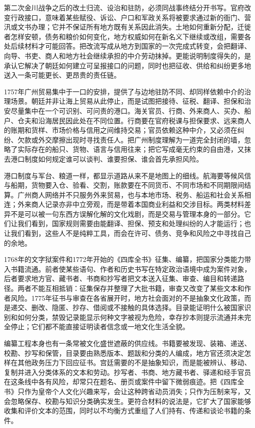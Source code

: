 第二次金川战争之后的改土归流、设治和驻防，必须同战事终结分开书写。官府改变行政接口，意味着某些赋役、诉讼、户口和军政关系将被要求通过新的衙门、营汛或文书办理；它并不保证所有地方既有关系因此消失。土地如何重新分配，迁徙者怎样安顿，债务和粮价如何变化，地方权威如何在新名义下继续或改组，需要各处后续材料才可能回答。把改流写成从地方到国家的一次完成式转变，会把翻译、向导、书吏、商人和地方社会继续承担的中介劳动抹掉。更能说明制度得失的，是承认它解决了朝廷如何建立可呈报接口的问题，同时也把征收、供给和纠纷更多地送入一条可能更长、更昂贵的责任链。

1757年广州贸易集中于一口的安排，提供了与边地驻防不同、却同样依赖中介的治理场景。朝廷并非让海上贸易从此停止，而是试图把接待、征税、翻译、担保和治安尽量集中在一个可识别、可问责的港口。海关官员、行商、外来商人、买办、船户、仓夫和沿海居民因此处在不同位置。行商要在官府税课与担保要求、远来商人的账期和货样、市场价格与信用之间维持交易；官员依赖这种中介，又必须在纠纷、欠款或外交摩擦出现时寻找责任人。把广州制度理解为一道完全封闭的墙，忽略了实际存在的船只、货物、语言与信用往来；把它写成毫无约束的自由港，又抹去港口制度如何规定谁可以谈判、谁要担保、谁会首先承担风险。

港口制度与军台、粮道一样，都显示道路从来不是地图上的细线。航海要等候风信与船期，货物要入仓、验看、交割，账款要在不同货币、不同市场和不同期限间结算。广州商人网络并不只服务外来贸易，也与本地市场、税务、船运和社会关系相连；外来商人记录亦非中立旁观，而是带着本国商业利益和交涉目标。两类材料差异不是可以被一句东西方误解化解的文化戏剧，而是交易与管理本身的一部分。它们让我们看到，国家规则需要由能翻译、担保、预支和处理纠纷的人才能运行；也让我们看到，这些人不是纯粹工具，而会在许可、债务、竞争和风险之中寻找自己的余地。

1768年的文字狱案件和1772年开始的《四库全书》征集、编纂，把国家分类能力带入书籍流通。前者使某些语句、作者和历史书写在特定政治语境中成为案件对象，后者要求地方官、藏书者、书商和抄写者把文本送入征集、审查、编目和转递路径。两者不能互相抵销：征集保存并整理了大批书籍，审查又改变了某些文本和作者风险。1775年征书与审查在各省展开时，地方社会面对的不是抽象文化政策，而是递交、删改、隐匿、抄存、借阅或不接触的具体选择。目录能证明什么被国家识别和如何分类，禁毁记录能显示何种文字被视为危险，幸存抄本则提示流通并未完全停止；它们都不能直接证明读者信念或一地文化生活全貌。

编纂工程本身也有一条常被文化盛世遮蔽的供应线。书籍要被发现、装箱、递送、校勘、抄写和保管，目录要由熟悉版本、题跋和分类的人编成，地方官还须决定怎样在其他政务压力下回应征书。宫廷需要的不是抽象知识，而是能被辨认、移动、复制并进入分类体系的文本和劳动。抄写者、书商、地方藏书者、驿递和经手官员在这条线中各有风险，却常只在题名、册页或案件中留下微弱痕迹。把《四库全书》只作为皇帝个人文化兴趣来写，会让这种跨省动员消失；只作为压制来写，又会忽略保存、校勘与知识分类确实发生。更符合材料的说法是，它扩大了国家能够收集和评价文本的范围，同时以不均衡方式重组了人们持有、传递和谈论书籍的条件。

